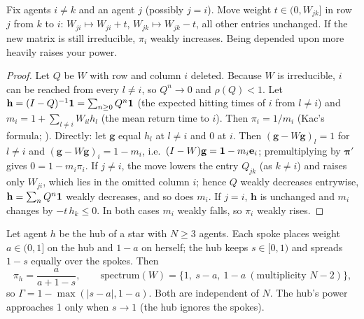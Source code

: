\documentclass[../structural_economics_book.tex]{subfiles}
\begin{document}
\begin{proposition}\label{ch06:prop:monotone}
Fix agents $i \neq k$ and an agent $j$ (possibly $j = i$). Move weight $t \in (0, W_{jk}]$ in row $j$ from $k$ to $i$: $W_{ji} \mapsto W_{ji} + t$, $W_{jk} \mapsto W_{jk} - t$, all other entries unchanged. If the new matrix is still irreducible, $\pi_i$ weakly increases. Being depended upon more heavily raises your power.
\end{proposition}

\begin{proof}
Let $Q$ be $W$ with row and column $i$ deleted. Because $W$ is irreducible, $i$ can be reached from every $l \neq i$, so $Q^n \to 0$ and $\rho(Q) < 1$. Let $\mathbf{h} = (I - Q)^{-1}\mathbf{1} = \sum_{n \geq 0} Q^n \mathbf{1}$ (the expected hitting times of $i$ from $l \neq i$) and $m_i = 1 + \sum_{l \neq i} W_{il}h_l$ (the mean return time to $i$). Then $\pi_i = 1/m_i$ (Kac's formula; \citealp[Prop.~1.14]{levin2009markov}). Directly: let $\mathbf{g}$ equal $h_l$ at $l \neq i$ and $0$ at $i$. Then $(\mathbf{g} - W\mathbf{g})_l = 1$ for $l \neq i$ and $(\mathbf{g} - W\mathbf{g})_i = 1 - m_i$, i.e.\ $(I - W)\mathbf{g} = \mathbf{1} - m_i\mathbf{e}_i$; premultiplying by $\boldsymbol{\pi}'$ gives $0 = 1 - m_i\pi_i$. If $j \neq i$, the move lowers the entry $Q_{jk}$ (as $k \neq i$) and raises only $W_{ji}$, which lies in the omitted column $i$; hence $Q$ weakly decreases entrywise, $\mathbf{h} = \sum_n Q^n\mathbf{1}$ weakly decreases, and so does $m_i$. If $j = i$, $\mathbf{h}$ is unchanged and $m_i$ changes by $-t\,h_k \leq 0$. In both cases $m_i$ weakly falls, so $\pi_i$ weakly rises.
\end{proof}

\begin{proposition}\label{ch06:prop:star_power}
Let agent $h$ be the hub of a star with $N \geq 3$ agents. Each spoke places weight $a \in (0,1]$ on the hub and $1-a$ on herself; the hub keeps $s \in [0,1)$ and spreads $1-s$ equally over the spokes. Then
\begin{equation}\label{ch06:eq:star}
\pi_h = \frac{a}{a + 1 - s}, \qquad \text{spectrum}(W) = \{1,\ s-a,\ 1-a\ (\text{multiplicity } N-2)\},
\end{equation}
so $\Gamma = 1 - \max(|s-a|, 1-a)$. Both are independent of $N$. The hub's power approaches 1 only when $s \to 1$ (the hub ignores the spokes).
\end{proposition}
\end{document}
